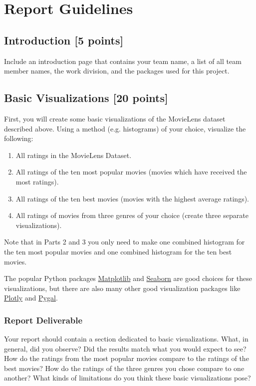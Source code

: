 \section{Report Guidelines}

\subsection{Introduction [5 points]}
Include an introduction page that contains your team name, a list of all team member names, the work division, and the packages used for this project.

\subsection{Basic Visualizations [20 points]}
First, you will create some basic visualizations of the MovieLens dataset described above. Using a method (e.g. histograms) of your choice, visualize the following:

\begin{enumerate}
	\item All ratings in the MovieLens Dataset.
	\item All ratings of the ten most popular movies (movies which have received the most ratings).
	\item All ratings of the ten best movies (movies with the highest average ratings).
	\item All ratings of movies from three genres of your choice (create three separate visualizations).
\end{enumerate}

Note that in Parts 2 and 3 you only need to make one combined histogram for the ten most popular movies and one combined histogram for the ten best movies.


The popular Python packages \href{http://matplotlib.org/} {Matplotlib} and \href{http://seaborn.pydata.org/} {Seaborn} are good choices for these visualizations, but there are also many other good visualization packages like \href{https://plotly.com/python/} {Plotly} and  \href{https://www.pygal.org/en/stable/index.html} {Pygal}.

\subsubsection{Report Deliverable}
Your report should contain a section dedicated to basic visualizations. What, in general, did you observe? Did the results match what you would expect to see? How do the ratings from the most popular movies compare to the ratings of the best movies? How do the ratings of the three genres you chose compare to one another? What kinds of limitations do you think these basic visualizations pose?

